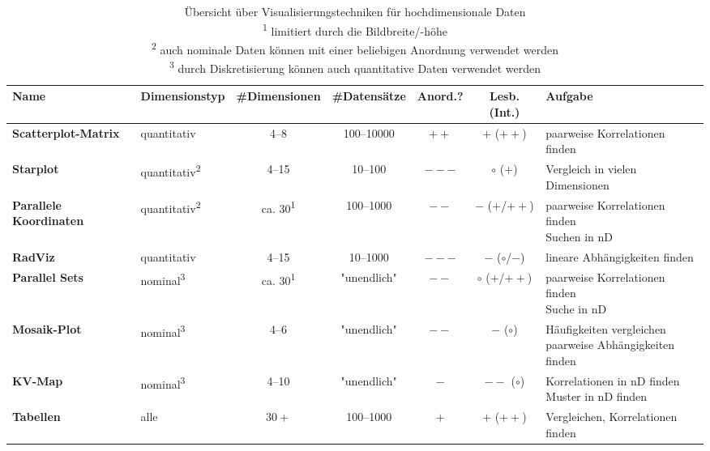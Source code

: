 		\begin{table}
			\centering
			\begin{tabular}{l|lccccl}
				\toprule
				\textbf{Name} & \textbf{Dimensionstyp} & \textbf{\#Dimensionen} & \textbf{\#Datensätze} & \textbf{Anord.?} & \textbf{Lesb. (Int.)} & \textbf{Aufgabe} \\ \midrule
				\textbf{Scatterplot-Matrix} & quantitativ & \numrange{4}{8} & \numrange{100}{10000} & \(++\) & \(+\) (\(++\)) & paarweise Korrelationen finden \\ \midrule
				\textbf{Starplot} & quantitativ\textsuperscript{2} & \numrange{4}{15} & \numrange{10}{100} & \(---\) & \(\circ\) (\(+\)) & Vergleich in vielen Dimensionen \\ \midrule
				\textbf{Parallele Koordinaten} & quantitativ\textsuperscript{2} & ca. \num{30}\textsuperscript{1} & \numrange{100}{1000} & \(--\) & \(-\) (\(+\)/\(++\)) & \multirowcell{2}[][l]{paarweise Korrelationen finden\\Suchen in nD} \\ \midrule
				\textbf{RadViz} & quantitativ & \numrange{4}{15} & \numrange{10}{1000} & \(---\) & \(-\) (\(\circ\)/\(-\)) & lineare Abhängigkeiten finden \\ \midrule
				\textbf{Parallel Sets} & nominal\textsuperscript{3} & ca. \num{30}\textsuperscript{1} & "unendlich" & \(--\) & \(\circ\) (\(+\)/\(++\)) & \multirowcell{2}[][l]{paarweise Korrelationen finden\\Suche in nD} \\ \midrule
				\textbf{Mosaik-Plot} & nominal\textsuperscript{3} & \numrange{4}{6} & "unendlich" & \(--\) & \(-\) (\(\circ\)) & \multirowcell{2}[][l]{Häufigkeiten vergleichen\\paarweise Abhängigkeiten finden} \\ \midrule
				\textbf{KV-Map} & nominal\textsuperscript{3} & \numrange{4}{10} & "unendlich" & \(-\) & \(--\) (\(\circ\)) & \multirowcell{2}[][l]{Korrelationen in nD finden\\Muster in nD finden} \\ \midrule
				\textbf{Tabellen} & alle & \(30+\) & \numrange{100}{1000} & \(+\) & \(+\) (\(++\)) & Vergleichen, Korrelationen finden \\
				\bottomrule
			\end{tabular}
			\caption[Übersicht über Visualisierungstechniken für hochdimensionale Daten]{
				Übersicht über Visualisierungstechniken für hochdimensionale Daten \\
				\textsuperscript{1} limitiert durch die Bildbreite/-höhe \\
				\textsuperscript{2} auch nominale Daten können mit einer beliebigen Anordnung verwendet werden \\
				\textsuperscript{3} durch Diskretisierung können auch quantitative Daten verwendet werden
			}
			\label{tab:hochdimDaten}
		\end{table}

